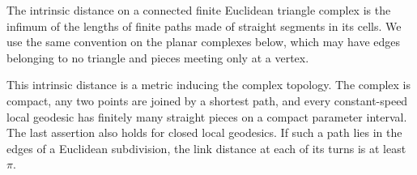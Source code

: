 The intrinsic distance on a connected finite Euclidean triangle complex
is the infimum of the lengths of finite paths made of straight segments
in its cells. We use the same convention on the planar complexes below,
which may have edges belonging to no triangle and pieces meeting only at
a vertex.

\begin{lemma}
\label{lem:finite-geodesics}
This intrinsic distance is a metric inducing the complex topology. The
complex is compact, any two points are joined by a shortest path, and every
constant-speed local geodesic has finitely many straight pieces on a compact
parameter interval. The last assertion also holds for closed local geodesics.
If such a path lies in the edges of a Euclidean subdivision, the link
distance at each of its turns is at least $\pi$.
\end{lemma}

